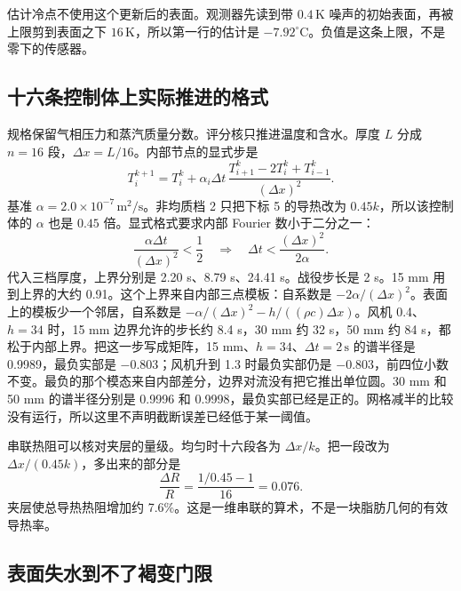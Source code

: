 估计冷点不使用这个更新后的表面。观测器先读到带 \(0.4\,\mathrm{K}\) 噪声的初始表面，再被上限剪到表面之下 \(16\,\mathrm{K}\)，所以第一行的估计是 \(-7.92^\circ\mathrm{C}\)。负值是这条上限，不是零下的传感器。

\subsection{十六条控制体上实际推进的格式}

规格保留气相压力和蒸汽质量分数。评分核只推进温度和含水。厚度 \(L\) 分成 \(n=16\) 段，\(\Delta x=L/16\)。内部节点的显式步是
\begin{equation}
\label{eq:fv-interior}
T_i^{k+1}=T_i^k+\alpha_i\Delta t\,\frac{T_{i+1}^k-2T_i^k+T_{i-1}^k}{(\Delta x)^2}.
\end{equation}
基准 \(\alpha=2.0\times 10^{-7}\,\mathrm{m}^2/\mathrm{s}\)。非均质档 2 只把下标 5 的导热改为 \(0.45k\)，所以该控制体的 \(\alpha\) 也是 \(0.45\) 倍。显式格式要求内部 Fourier 数小于二分之一：
\begin{equation}
\label{eq:fv-fo}
\frac{\alpha\Delta t}{(\Delta x)^2}<\frac12
\quad\Rightarrow\quad
\Delta t<\frac{(\Delta x)^2}{2\alpha}.
\end{equation}
代入三档厚度，上界分别是 2.20 s、8.79 s、24.41 s。战役步长是 2 s。15 mm 用到上界的大约 0.91。这个上界来自内部三点模板：自系数是 \(-2\alpha/(\Delta x)^2\)。表面上的模板少一个邻居，自系数是 \(-\alpha/(\Delta x)^2-h/((\rho c)\Delta x)\)。风机 0.4、\(h=34\) 时，15 mm 边界允许的步长约 8.4 s，30 mm 约 32 s，50 mm 约 84 s，都松于内部上界。把这一步写成矩阵，15 mm、\(h=34\)、\(\Delta t=2\,\mathrm{s}\) 的谱半径是 0.9989，最负实部是 \(-0.803\)；风机升到 1.3 时最负实部仍是 \(-0.803\)，前四位小数不变。最负的那个模态来自内部差分，边界对流没有把它推出单位圆。30 mm 和 50 mm 的谱半径分别是 0.9996 和 0.9998，最负实部已经是正的。网格减半的比较没有运行，所以这里不声明截断误差已经低于某一阈值。

串联热阻可以核对夹层的量级。均匀时十六段各为 \(\Delta x/k\)。把一段改为 \(\Delta x/(0.45k)\)，多出来的部分是
\begin{equation}
\label{eq:fv-fat}
\frac{\Delta R}{R}=\frac{1/0.45-1}{16}=0.076.
\end{equation}
夹层使总导热热阻增加约 7.6\%。这是一维串联的算术，不是一块脂肪几何的有效导热率。

\subsection{表面失水到不了褐变门限}

